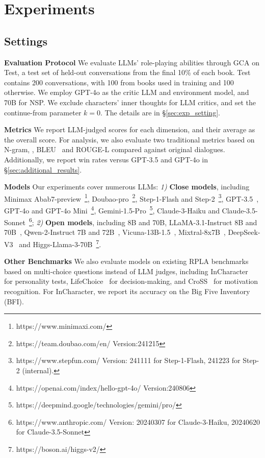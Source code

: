 \section{Experiments}

\subsection{Settings}

\textbf{Evaluation Protocol} \quad 
We evaluate LLMs' role-playing abilities through GCA on \method Test, a test set of held-out conversations from the final 10\% of each book. 
\method Test contains 200 conversations, with 100 from books used in \method training and 100 otherwise.  
We employ GPT-4o as the critic LLM and environment model, and \method 70B for NSP. 
We exclude characters' inner thoughts for LLM critics, and set the continue-from parameter $k=0$. 
The details are in \S\ref{sec:exp_setting}.

\textbf{Metrics} \quad 
We report LLM-judged scores for each dimension, and their average as the overall score.
For analysis, we also evaluate two traditional metrics based on N-gram, \ie,  BLEU~\citep{papineni2002bleu} and ROUGE-L\citep{lin2004rougel} compared against original dialogues. 
Additionally, we report win rates versus GPT-3.5 and GPT-4o in \S\ref{sec:additional_results}. %

\textbf{Models} \quad 
Our experiments cover numerous LLMs: 
\textit{1)} \textbf{Close models}, including 
Minimax Abab7-preview~\footnote{https://www.minimaxi.com/}, Doubao-pro~\footnote{https://team.doubao.com/en/ Version:241215}, Step-1-Flash and Step-2~\footnote{https://www.stepfun.com/ Version: 241111 for Step-1-Flash, 241223 for Step-2 (internal).}, GPT-3.5~\citep{openai2022chatgpt}, GPT-4o and GPT-4o Mini~\footnote{https://openai.com/index/hello-gpt-4o/ Version:240806}, Gemini-1.5-Pro~\footnote{https://deepmind.google/technologies/gemini/pro/}, Claude-3-Haiku and Claude-3.5-Sonnet~\footnote{https://www.anthropic.com/ Version: 20240307 for Claude-3-Haiku, 20240620 for Claude-3.5-Sonnet}; 
\textit{2)} \textbf{Open models}, including \method 8B and 70B, LLaMA-3.1-Instruct 8B and 70B~\citep{dubey2024llama},  Qwen-2-Instruct 7B and  72B~\citep{yang2024qwen2technicalreport}, Vicuna-13B-1.5~\citep{zheng2023judging}, Mixtral-8x7B~\citep{jiang2024mixtral}, DeepSeek-V3~\citep{liu2024deepseek} and Higgs-Llama-3-70B~\footnote{https://boson.ai/higgs-v2/}. 

\textbf{Other Benchmarks} \quad 
We also evaluate \method models on existing RPLA benchmarks based on multi-choice questions instead of LLM judges, including InCharacter~\citep{wang2024incharacter} for personality tests, LifeChoice~\citep{xu2024character} for decision-making, and CroSS~\citep{yuan2024evaluating} for motivation recognition. 
For InCharacter, we report its accuracy on the Big Five Inventory (BFI).  



